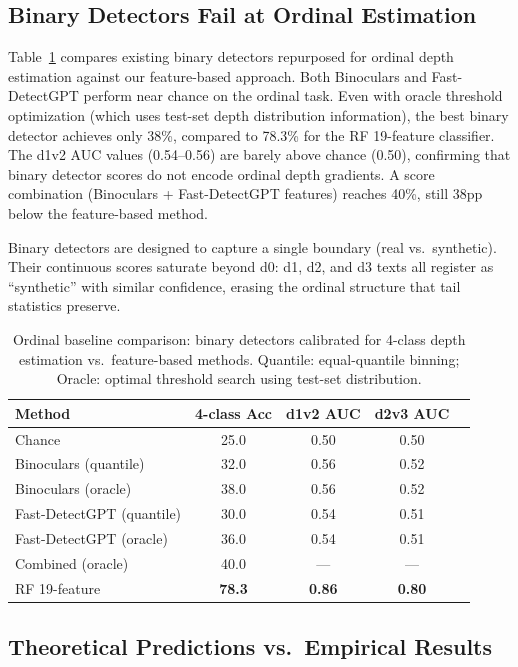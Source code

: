 \documentclass[11pt,a4paper]{article}
\begin{document}
\subsection{Binary Detectors Fail at Ordinal Estimation}

Table~\ref{tab:baseline} compares existing binary detectors repurposed for ordinal depth estimation against our feature-based approach. Both Binoculars and Fast-DetectGPT perform near chance on the ordinal task. Even with oracle threshold optimization (which uses test-set depth distribution information), the best binary detector achieves only 38\%, compared to 78.3\% for the RF 19-feature classifier. The d1v2 AUC values (0.54--0.56) are barely above chance (0.50), confirming that binary detector scores do not encode ordinal depth gradients. A score combination (Binoculars + Fast-DetectGPT features) reaches 40\%, still 38pp below the feature-based method.

Binary detectors are designed to capture a single boundary (real vs.\ synthetic). Their continuous scores saturate beyond d0: d1, d2, and d3 texts all register as ``synthetic'' with similar confidence, erasing the ordinal structure that tail statistics preserve.

\begin{table}[t]
\centering
\caption{Ordinal baseline comparison: binary detectors calibrated for 4-class depth estimation vs.\ feature-based methods. Quantile: equal-quantile binning; Oracle: optimal threshold search using test-set distribution.}
\label{tab:baseline}
\small
\begin{tabular}{lcccc}
\toprule
\textbf{Method} & \textbf{4-class Acc} & \textbf{d1v2 AUC} & \textbf{d2v3 AUC} \\
\midrule
Chance & 25.0 & 0.50 & 0.50 \\
Binoculars (quantile)   & 32.0 & 0.56 & 0.52 \\
Binoculars (oracle)     & 38.0 & 0.56 & 0.52 \\
Fast-DetectGPT (quantile) & 30.0 & 0.54 & 0.51 \\
Fast-DetectGPT (oracle) & 36.0 & 0.54 & 0.51 \\
Combined (oracle)       & 40.0 & --- & --- \\
\midrule
RF 19-feature           & \textbf{78.3} & \textbf{0.86} & \textbf{0.80} \\
\bottomrule
\end{tabular}
\end{table}

\subsection{Theoretical Predictions vs.\ Empirical Results}
\end{document}
